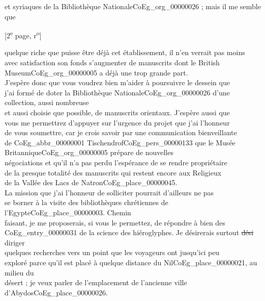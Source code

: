 \documentclass{book}
\begin{document}
et syriaques de la Bibliothèque Nationale\gls{CoEg_org_00000026} ; mais il me semble que
{\footnotesize \begin{center} {[2\textsuperscript{e} page, r\textsuperscript{o}]}\end{center}}
\noindent quelque riche que puisse être déjà cet établissement, il n’en verrait pas moins\\
avec satisfaction son fonds s’augmenter de manuscrits dont le British\\
Museum\gls{CoEg_org_00000005} a déjà une trop grande part.\\
\indent J’espère donc que vous voudrez bien m’aider à poursuivre le dessein que\\
j’ai formé de doter la Bibliothèque Nationale\gls{CoEg_org_00000026} d’une collection, aussi nombreuse\\
et aussi choisie que possible, de manuscrits orientaux. J’espère aussi que\\
vous me permettrez d’appuyer sur l’urgence du projet que j’ai l’honneur\\
de vous soumettre, car je crois savoir par une communication bienveillante\\
de \gls{CoEg_abbr_00000001} Tischendrof\gls{CoEg_pers_00000133} que le Musée Britannique\gls{CoEg_org_00000005} prépare de nouvelles\\
négociations et qu’il n’a pas perdu l’espérance de se rendre propriétaire\\
de la presque totalité des manuscrits qui restent encore aux Religieux\\
de la Vallée des Lacs de Natron\gls{CoEg_place_00000045}.\\
\indent La mission que j’ai l’honneur de solliciter pourrait d’ailleurs ne pas\\
se borner à la visite des bibliothèques chrétiennes de l’Egypte\gls{CoEg_place_00000003}. Chemin\\
faisant, je me proposerais, si vous le permettez, de répondre à bien des\\
\gls{CoEg_entry_00000031} de la science des hiéroglyphes. Je désirerais surtout \sout{dési} diriger\\
quelques recherches vers un point que les voyageurs ont jusqu’ici peu\\
exploré parce qu’il est placé à quelque distance du Nil\gls{CoEg_place_00000021}, au milieu du\\
désert ; je veux parler de l’emplacement de l’ancienne ville d’Abydos\gls{CoEg_place_00000026}.\\
\end{document}
